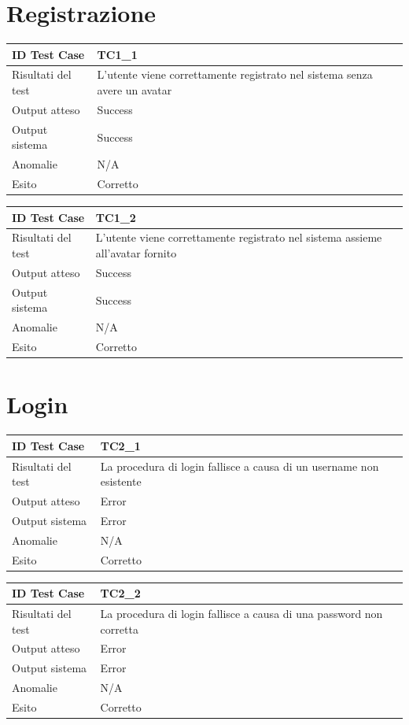 \section{Registrazione}
\begin{tabular}{|| l | p{25em} ||} 
\hline
ID Test Case & TC1\_1\\
\hline
Risultati del test & L'utente viene correttamente registrato nel sistema senza avere un avatar\\
\hline
Output atteso & Success\\
\hline
Output sistema & Success\\
\hline
Anomalie & N/A\\
\hline
Esito & Corretto\\
\hline
\end{tabular}

\newpage
\begin{tabular}{|| l | p{25em} ||} 
\hline
ID Test Case & TC1\_2\\
\hline
Risultati del test & L'utente viene correttamente registrato nel sistema assieme all'avatar fornito\\
\hline
Output atteso & Success\\
\hline
Output sistema & Success\\
\hline
Anomalie & N/A\\
\hline
Esito & Corretto\\
\hline
\end{tabular}

\newpage
\section{Login}
\begin{tabular}{|| l | p{25em} ||} 
\hline
ID Test Case & TC2\_1\\
\hline
Risultati del test & La procedura di login fallisce a causa di un username non esistente\\
\hline
Output atteso & Error\\
\hline
Output sistema & Error\\
\hline
Anomalie & N/A\\
\hline
Esito & Corretto\\
\hline
\end{tabular}

\newpage
\begin{tabular}{|| l | p{25em} ||} 
\hline
ID Test Case & TC2\_2\\
\hline
Risultati del test & La procedura di login fallisce a causa di una password non corretta\\
\hline
Output atteso & Error\\
\hline
Output sistema & Error\\
\hline
Anomalie & N/A\\
\hline
Esito & Corretto\\
\hline
\end{tabular}

